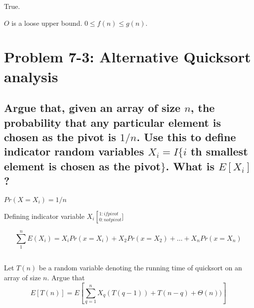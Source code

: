 \documentclass[titlepage]{article}\usepackage[]{graphicx}\usepackage[]{color}
\begin{document}
%


True. 

$O$ is a loose upper bound. $0 \leq f(n) \leq g(n)$. 

\section{ Problem 7-3: Alternative Quicksort analysis}
\subsection{ 
Argue that, given an array of size $n$, the probability that any particular element
is chosen as the pivot is $1/n$. Use this to define indicator random variables
$X_i = I\{ i$ th smallest element is chosen as the pivot$\}$. What is
$E[X_i]$?}

$Pr(X=X_i) = 1/n$

Defining indicator variable $X_i \left[_{0: not pivot}^{1: if pivot}\right.]$

\[ \sum_{1}^{n} E(X_i) = X_i Pr(x=X_i) + X_2Pr(x = X_2) + \dots + X_n
Pr(x=X_n) \]



\subsection{}
Let $T(n)$ be a random variable denoting the running time of quicksort on an
array of size $n$. Argue that \\
\[ E[T(n)] = E \left[ \sum_{q=1}^{n} X_q (T(q-1)) + T(n-q) + \Theta(n))\right] \]
\end{document}
